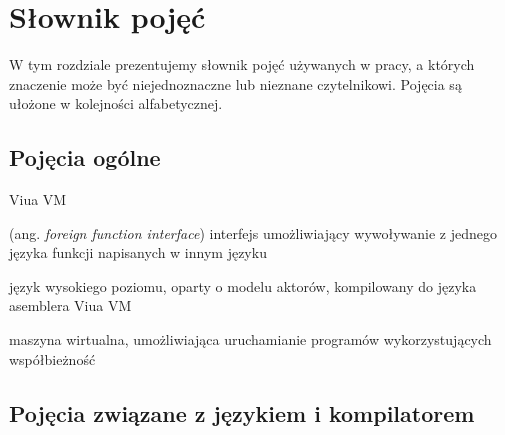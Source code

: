 \section{Słownik pojęć}
\label{slownik_pojec}

W tym rozdziale prezentujemy słownik pojęć używanych w pracy, a których znaczenie może być niejednoznaczne lub
nieznane czytelnikowi.
Pojęcia są ułożone w kolejności alfabetycznej.

\subsection{Pojęcia ogólne}
\label{slownik_pojec_ogolnych}

\begin{labeling}{Viua VM}
    \item [FFI] (ang. \emph{foreign function interface}) interfejs umożliwiający wywoływanie z jednego języka
        funkcji napisanych w innym języku
    \item [ViuAct] język wysokiego poziomu, oparty o modelu aktorów, kompilowany
        do języka asemblera Viua VM
    \item [Viua VM] maszyna wirtualna, umożliwiająca uruchamianie programów
        wykorzystujących współbieżność
\end{labeling}

\subsection{Pojęcia związane z językiem i kompilatorem}
\label{slownik_pojec_jezyka}

